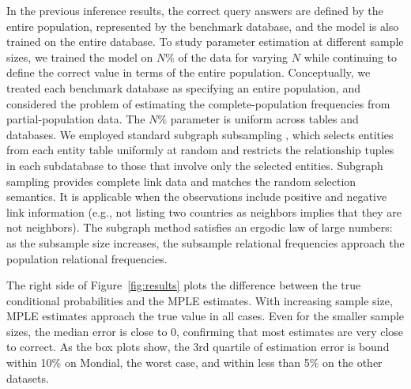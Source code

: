 \documentclass[oribibl]{llncs}
\begin{document}
In the previous inference results, the correct query answers are defined by the entire population, represented by the benchmark database, and the model is also trained on the entire database.
To study parameter estimation at different sample sizes, we trained the model on $N\%$ of the data for varying $N$ while continuing to define the correct value in terms of the entire population. 
Conceptually, we treated each benchmark database as specifying an entire population, and considered the problem of estimating the complete-population frequencies from partial-population data. The $N\%$ parameter is uniform across tables and databases. 
We employed standard subgraph subsampling \cite{Frank1977,Khosravi2010}, which selects entities from each entity table uniformly at random and restricts the relationship tuples in each subdatabase to those that involve only the selected entities. Subgraph sampling provides complete link data and matches the random selection semantics. It is applicable when the observations include positive and negative link information (e.g., not listing two countries as neighbors implies that they are not neighbors). The subgraph method satisfies an ergodic law of large numbers: as the subsample size increases, the subsample relational frequencies approach the population relational frequencies. 


The right side of Figure~\ref{fig:results} plots the difference between the true conditional probabilities and the MPLE estimates.
With increasing sample size, MPLE estimates approach the true value in all cases. Even for the smaller sample sizes, the median error is close to 0, confirming that most estimates are very close to correct. As the box plots show, the 3rd quartile of estimation error is bound within 10\% on Mondial, the worst case, and within less than 5\% on the other datasets. %
\end{document}

